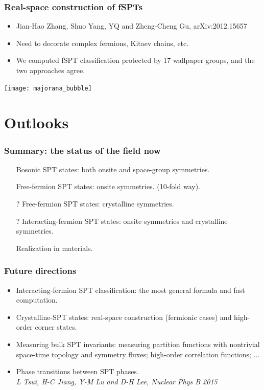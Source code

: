 \documentclass[xcolor=table, aspectratio=169,ignorenonframetext]{beamer}
\begin{document}
\begin{frame}
  \frametitle{Real-space construction of fSPTs}

  \begin{itemize}
  \item Jian-Hao Zhang, Shuo Yang, YQ and Zheng-Cheng Gu, arXiv:2012.15657
  \item Need to decorate complex fermions, Kitaev chains, etc.
  \item We computed fSPT classification protected by 17 wallpaper groups, and the two approaches agree.
  \end{itemize}
  \begin{center}
    \texttt{[image: majorana\_bubble]}
  \end{center}
\end{frame}

\section{Outlooks}

\begin{frame}
  \frametitle{Summary: the status of the field now}
  \begin{itemize}
  \item[\ding{51}] Bosonic SPT states: both onsite and space-group symmetries.
  \item[\ding{51}] Free-fermion SPT states: onsite symmetries. (10-fold way).
  \item[?] Free-fermion SPT states: crystalline symmetries.
  \item[?] Interacting-fermion SPT states: onsite symmetries and crystalline symmetries.
  \item[\ding{55}] Realization in materials.
  \end{itemize}
\end{frame}

\begin{frame}
  \frametitle{Future directions}
  \begin{itemize}
  \item Interacting-fermion SPT classification: the most general formula and fast computation.
  \item Crystalline-SPT states: real-space construction (fermionic cases) and high-order corner states.
  \item Measuring bulk SPT invariants: measuring partition functions with nontrivial space-time topology and symmetry fluxes; high-order correlation functions; ...\\
    \emph{\small}
  \item Phase transitions between SPT phases.\\
    \emph{\small L Tsui, H-C Jiang, Y-M Lu and D-H Lee, Nuclear Phys B 2015}
  \end{itemize}
\end{frame}
\end{document}

